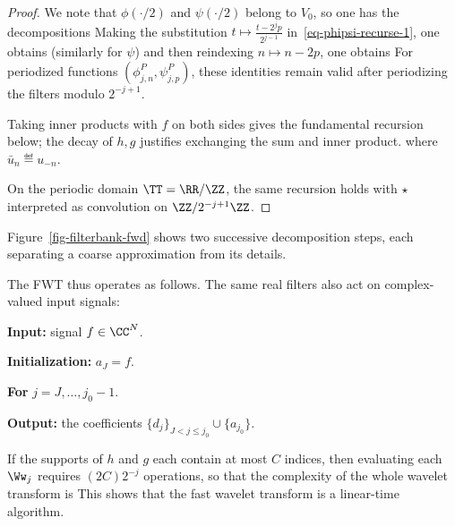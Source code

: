 \begin{proof}
We note that $\phi(\cdot/2)$ and $\psi(\cdot/2)$ belong to $V_0$, so one has the decompositions
Making the substitution $t \mapsto \frac{t-2^j p}{2^{j-1}}$ in~\eqref{eq-phipsi-recurse-1}, one obtains
(similarly for $\psi$) and then reindexing $n \mapsto n-2p$, one obtains
For periodized functions $(\phi_{j,n}^P,\psi_{j,p}^P)$, these identities remain valid after periodizing the filters modulo $2^{-j+1}$.
 
Taking inner products with $f$ on both sides gives the fundamental recursion below; the decay of $h,g$ justifies exchanging the sum and inner product.
where $\bar u_n \eqdef u_{-n}$. 
 
On the periodic domain $\TT=\RR/\ZZ$, the same recursion holds with $\star$ interpreted as convolution on $\ZZ/2^{-j+1}\ZZ$.
\end{proof}

Figure~\ref{fig-filterbank-fwd} shows two successive decomposition steps, each separating a coarse approximation from its details.


The FWT thus operates as follows. The same real filters also act on complex-valued input signals:
\begin{rs}
	\item \textbf{Input:} signal $f \in \CC^N$.
	\item \textbf{Initialization:} $a_J = f$.
	\item \textbf{For} $j=J,\ldots,j_0-1$.
	\item \textbf{Output:} the coefficients $\{d_j\}_{J<j\leq j_0} \cup \{ a_{j_0} \}$.
\end{rs}

If the supports of $h$ and $g$ each contain at most $C$ indices, then evaluating each $\Ww_j$ requires $(2C) 2^{-j}$ operations, so that the complexity of the whole wavelet transform is
This shows that the fast wavelet transform is a linear-time algorithm.
 
